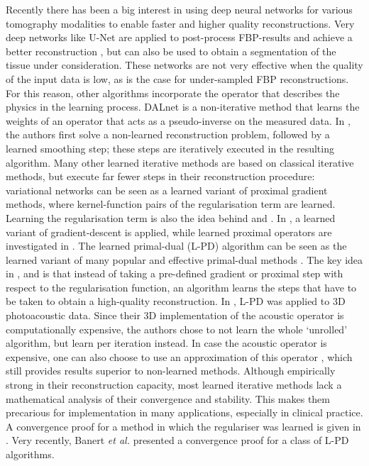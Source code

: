 \documentclass[journal]{IEEEtran}
\begin{document}
Recently there has been a big interest in using deep neural networks for various tomography modalities to enable faster and higher quality reconstructions. Very deep networks like U-Net \cite{Ronneberger2015} are applied to post-process FBP-results and achieve a better reconstruction \cite{Jin2017, Antholzer2017, Kofler2018, Waibel2018}, but can also be used to obtain a segmentation of the tissue under consideration. These networks are not very effective when the quality of the input data is low, as is the case for under-sampled FBP reconstructions. For this reason, other algorithms incorporate the operator that describes the physics in the learning process. DALnet \cite{Schwab2018} is a non-iterative method that learns the weights of an operator that acts as a pseudo-inverse on the measured data. In \cite{Kelly2017}, the authors first solve a non-learned reconstruction problem, followed by a learned smoothing step; these steps are iteratively executed in the resulting algorithm. Many other learned iterative methods are based on classical iterative methods, but execute far fewer steps in their reconstruction procedure: variational networks \cite{Kobler2017b, Hammernik2017f, Kobler2018, Hammernik2018} can be seen as a learned variant of proximal gradient methods, where kernel-function pairs of the regularisation term are learned. Learning the regularisation term is also the idea behind \cite{Chen2018} and \cite{Li2018}. In \cite{Adler2017a}, a learned variant of gradient-descent is applied, while learned proximal operators are investigated in \cite{Meinhardt2017}. The learned primal-dual (L-PD) algorithm \cite{Adler2018} can be seen as the learned variant of many popular and effective primal-dual methods \cite{Esser2010}. The key idea in \cite{Adler2017a}, \cite{Meinhardt2017} and \cite{Adler2018} is that instead of taking a pre-defined gradient or proximal step with respect to the regularisation function, an algorithm learns the steps that have to be taken to obtain a high-quality reconstruction. In \cite{Hauptmann2018}, L-PD was applied to 3D photoacoustic data. Since their 3D implementation of the acoustic operator is computationally expensive, the authors chose to not learn the whole `unrolled' algorithm, but learn per iteration instead. In case the acoustic operator is expensive, one can also choose to use an approximation of this operator \cite{Hauptmann2018b}, which still provides results superior to non-learned methods. Although empirically strong in their reconstruction capacity, most learned iterative methods lack a mathematical analysis of their convergence and stability. This makes them precarious for implementation in many applications, especially in clinical practice. A convergence proof for a method in which the regulariser was learned is given in \cite{Li2018}. Very recently, Banert \emph{et al.} \cite{Banert2018} presented a convergence proof for a class of L-PD algorithms. 
\end{document}
